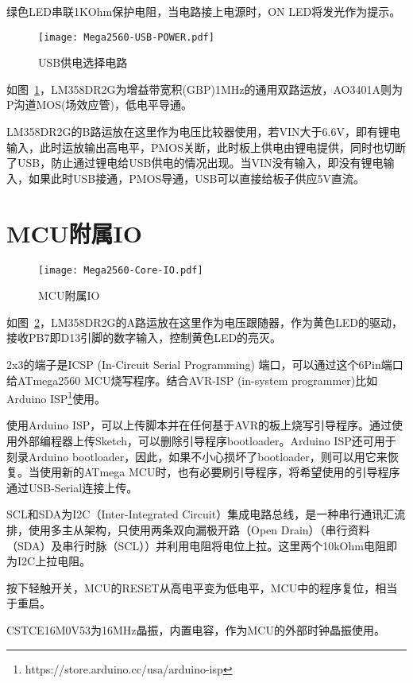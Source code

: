 绿色LED串联1KOhm保护电阻，当电路接上电源时，ON LED将发光作为提示。

\begin{figure}[htbp]
    \centering
    \texttt{[image: Mega2560-USB-POWER.pdf]}
    \caption{USB供电选择电路}
    \label{fig:Mega2560-USB-POWER}
\end{figure}

如图~\ref{fig:Mega2560-USB-POWER}，LM358DR2G为增益带宽积(GBP)1MHz的通用双路运放，AO3401A则为P沟道MOS(场效应管)，低电平导通。

LM358DR2G的B路运放在这里作为电压比较器使用，若VIN大于6.6V，即有锂电输入，此时运放输出高电平，PMOS关断，此时板上供电由锂电提供，同时也切断了USB，防止通过锂电给USB供电的情况出现。当VIN没有输入，即没有锂电输入，如果此时USB接通，PMOS导通，USB可以直接给板子供应5V直流。

\section{MCU附属IO}

\begin{figure}[htbp]
    \centering
    \texttt{[image: Mega2560-Core-IO.pdf]}
    \caption{MCU附属IO}
    \label{fig:Mega2560-Core-IO}
\end{figure}

如图~\ref{fig:Mega2560-Core-IO}，LM358DR2G的A路运放在这里作为电压跟随器，作为黄色LED的驱动，接收PB7即D13引脚的数字输入，控制黄色LED的亮灭。

2x3的端子是ICSP (In-Circuit Serial Programming) 端口，可以通过这个6Pin端口给ATmega2560 MCU烧写程序。结合AVR-ISP (in-system programmer)比如Arduino ISP\footnote{https://store.arduino.cc/usa/arduino-isp}使用。

使用Arduino ISP，可以上传脚本并在任何基于AVR的板上烧写引导程序。通过使用外部编程器上传Sketch，可以删除引导程序bootloader。Arduino ISP还可用于刻录Arduino bootloader，因此，如果不小心损坏了bootloader，则可以用它来恢复。当使用新的ATmega MCU时，也有必要刷引导程序，将希望使用的引导程序通过USB-Serial连接上传。

SCL和SDA为I2C（Inter-Integrated Circuit）集成电路总线，是一种串行通讯汇流排，使用多主从架构，只使用两条双向漏极开路（Open Drain）（串行资料（SDA）及串行时脉（SCL））并利用电阻将电位上拉。这里两个10kOhm电阻即为I2C上拉电阻。

按下轻触开关，MCU的RESET从高电平变为低电平，MCU中的程序复位，相当于重启。

CSTCE16M0V53为16MHz晶振，内置电容，作为MCU的外部时钟晶振使用。

